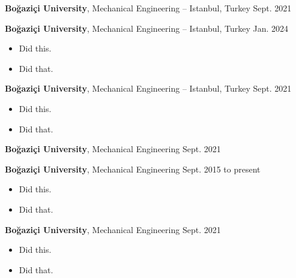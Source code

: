 \documentclass[10pt, letterpaper]{article}
\newenvironment{highlights}{
        \begin{itemize}[
                topsep=0pt,
                partopsep=0pt,
                itemsep=0pt,
                leftmargin=10pt
            ]
    }{
        \end{itemize}
    } %
\begin{document}
        \vspace{8pt}

        \textbf{Boğaziçi University}, Mechanical Engineering -- Istanbul, Turkey \hfill Sept. 2021



        \vspace{8pt}

        \textbf{Boğaziçi University}, Mechanical Engineering -- Istanbul, Turkey \hfill Jan. 2024

        \begin{highlights}
        \item Did this.
        \item Did that.
        \end{highlights}


        \vspace{8pt}

        \textbf{Boğaziçi University}, Mechanical Engineering -- Istanbul, Turkey \hfill Sept. 2021

        \begin{highlights}
        \item Did this.
        \item Did that.
        \end{highlights}


        \vspace{8pt}

        \textbf{Boğaziçi University}, Mechanical Engineering \hfill Sept. 2021



        \vspace{8pt}

        \textbf{Boğaziçi University}, Mechanical Engineering \hfill Sept. 2015 to present

        \begin{highlights}
        \item Did this.
        \item Did that.
        \end{highlights}


        \vspace{8pt}

        \textbf{Boğaziçi University}, Mechanical Engineering \hfill Sept. 2021

        \begin{highlights}
        \item Did this.
        \item Did that.
        \end{highlights}
\end{document}
